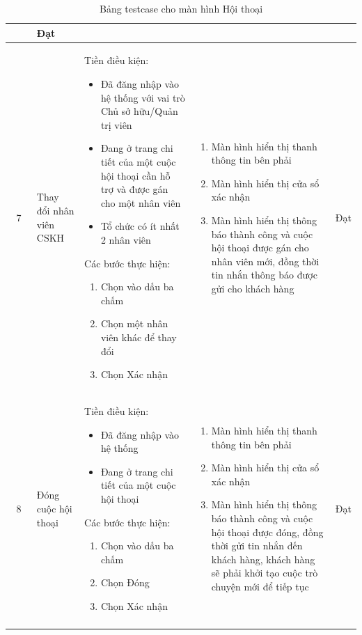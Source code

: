 \begin{longtable}{|c|m{2.5cm}|m{5.5cm}|m{4.5cm}|c|}
\begin{enumerate}[label=\arabic*.]
    \end{enumerate} & Đạt \\
    \hline
    7 & 
    Thay đổi nhân viên CSKH & 
    Tiền điều kiện:
    \begin{itemize}
        \item Đã đăng nhập vào hệ thống với vai trò Chủ sở hữu/Quản trị viên
        \item Đang ở trang chi tiết của một cuộc hội thoại cần hỗ trợ và được gán cho một nhân viên
        \item Tổ chức có ít nhất 2 nhân viên
    \end{itemize}
    Các bước thực hiện: 
    \begin{enumerate}[label=\arabic*.]
        \item Chọn vào dấu ba chấm
        \item Chọn một nhân viên khác để thay đổi
        \item Chọn Xác nhận
    \end{enumerate}
    & 
    \begin{enumerate}[label=\arabic*.]
        \item Màn hình hiển thị thanh thông tin bên phải 
        \item Màn hình hiển thị cửa sổ xác nhận
        \item Màn hình hiển thị thông báo thành công và cuộc hội thoại được gán cho nhân viên mới, đồng thời tin nhắn thông báo được gửi cho khách hàng
    \end{enumerate} & Đạt \\
    \hline
    8 & 
    Đóng cuộc hội thoại & 
    Tiền điều kiện:
    \begin{itemize}
        \item Đã đăng nhập vào hệ thống
        \item Đang ở trang chi tiết của một cuộc hội thoại
    \end{itemize}
    Các bước thực hiện: 
    \begin{enumerate}[label=\arabic*.]
        \item Chọn vào dấu ba chấm
        \item Chọn Đóng
        \item Chọn Xác nhận
    \end{enumerate}
    & 
    \begin{enumerate}[label=\arabic*.]
        \item Màn hình hiển thị thanh thông tin bên phải 
        \item Màn hình hiển thị cửa sổ xác nhận
        \item Màn hình hiển thị thông báo thành công và cuộc hội thoại được đóng, đồng thời gửi tin nhắn đến khách hàng, khách hàng sẽ phải khởi tạo cuộc trò chuyện mới để tiếp tục
    \end{enumerate} & Đạt \\
    \hline
    \caption{Bảng testcase cho màn hình Hội thoại}
\end{longtable}